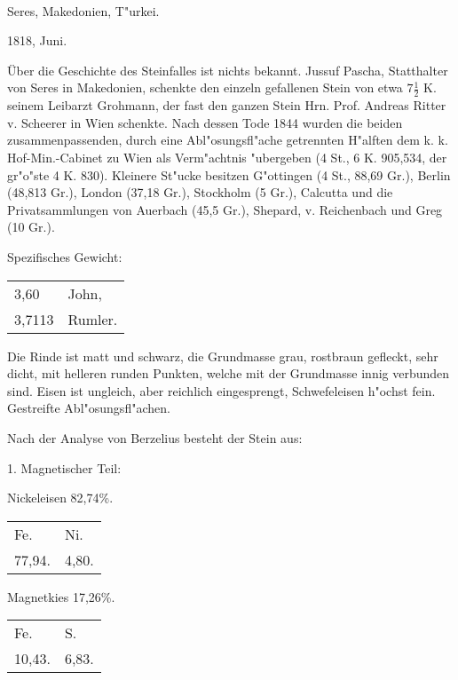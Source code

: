 \documentclass[a4paper, 11pt, oneside]{article}
\begin{document}
\paragraph{}
Seres, Makedonien, T"urkei.

1818, Juni.

Über die Geschichte des Steinfalles ist nichts bekannt. Jussuf Pascha, Statthalter von Seres in Makedonien, schenkte den einzeln gefallenen Stein von etwa $\mathfrak{7\frac{1}{2}}$ K. seinem Leibarzt Grohmann, der fast den ganzen Stein Hrn. Prof. Andreas Ritter v. Scheerer in Wien schenkte. Nach dessen Tode 1844 wurden die beiden zusammenpassenden, durch eine Abl"osungsfl"ache getrennten H"alften dem k. k. Hof-Min.-Cabinet zu Wien als Verm"achtnis "ubergeben (4 St., 6 K. 905,534, der gr"o"ste 4 K. 830). Kleinere St"ucke besitzen G"ottingen (4 St., 88,69 Gr.), Berlin (48,813 Gr.), London (37,18 Gr.), Stockholm (5 Gr.), Calcutta und die Privatsammlungen von Auerbach (45,5 Gr.), Shepard, v. Reichenbach und Greg (10 Gr.).

Spezifisches Gewicht:
\begin{table}[!ht]
    \centering\swabfamily\Large
    \begin{tabular}{l l}
        3,60 & John,\\
        3,7113 & Rumler.
    \end{tabular}
\end{table}

Die Rinde ist matt und schwarz, die Grundmasse grau, rostbraun gefleckt, sehr dicht, mit helleren runden Punkten, welche mit der Grundmasse innig verbunden sind. Eisen ist ungleich, aber reichlich eingesprengt, Schwefeleisen h"ochst fein. Gestreifte Abl"osungsfl"achen.

Nach der Analyse von Berzelius besteht der Stein aus:

1. Magnetischer Teil:
\begin{center}
Nickeleisen 82,74\%.
\end{center}

\begin{table}[!ht]
    \centering\swabfamily\Large
    \begin{tabular}{l l}
        Fe. & Ni. \\
        77,94. & 4,80. \\
    \end{tabular}
\end{table}
\begin{center}
Magnetkies 17,26\%.
\end{center}
\begin{table}[!ht]
    \centering\swabfamily\Large
    \begin{tabular}{l l}
        Fe. & S. \\
        10,43. & 6,83. \\
    \end{tabular}
\end{table}
\end{document}
